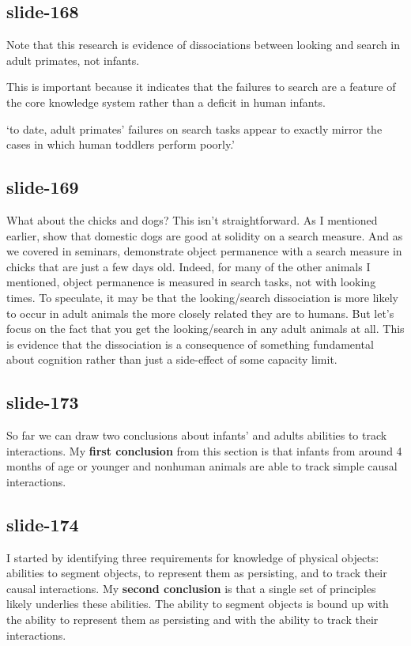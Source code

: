 \documentclass[12pt,\papersize]{extarticle}
\begin{document}
\subsection{slide-168}
Note that this research is evidence of dissociations between looking and search in adult primates, not infants.
 
This is important because it indicates that the failures to search are a feature of the core knowledge system rather than a deficit in human infants.
 
‘to date, adult primates’ failures on search tasks appear to 
exactly mirror the cases in which human toddlers perform poorly.’
\citep[p.\ 17]{santos:2009_object}
 
\subsection{slide-169}
What about the chicks and dogs?
This isn't straightforward.
As I mentioned earlier, \citep{kundey:2010_domesticated} show that domestic dogs are good 
at solidity on a search measure.  And as we covered in seminars, 
\citep{chiandetti:2011_chicks_op} demonstrate object permanence with a search measure in 
chicks that are just a few days old.
Indeed, for many of the other animals I mentioned, object permanence is measured in search 
tasks, not with looking times.
To speculate, it may be that the looking/search dissociation is more likely to occur in
adult animals the more closely related they are to humans.
But let's focus on the fact that you get the looking/search in any adult animals at all.
This is evidence that the dissociation is a consequence of something fundamental about 
cognition rather than just a side-effect of some capacity limit.
 
\subsection{slide-173}
So far we can draw two conclusions about infants' and adults abilities to track 
interactions.  My \textbf{first conclusion} from this section is that infants from around 
4 months of 
age or younger and nonhuman animals are able to track simple causal interactions.
 
\subsection{slide-174}
I started by identifying three requirements for knowledge of physical objects: 
abilities to segment objects, to represent them as persisting, and to track their causal 
interactions.
My \textbf{second conclusion} is that a single set of principles likely underlies these 
abilities.  The ability to segment objects is bound up with the ability 
to represent them as persisting and with the ability to track their interactions.
 
\end{document}
